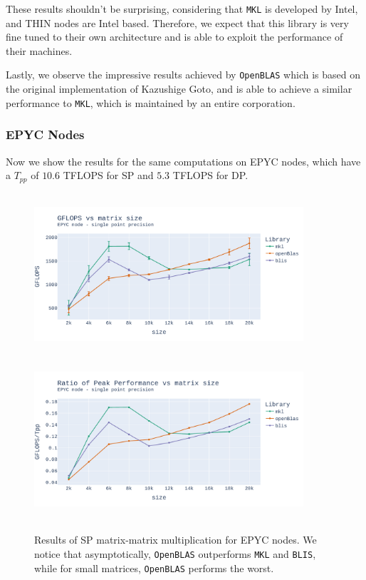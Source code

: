 \documentclass{report}
\begin{document}
These results shouldn't be surprising, considering 
that \texttt{MKL} is developed by Intel, and THIN nodes are Intel based.
Therefore, we expect that this library is very fine tuned to their own architecture 
and is able to exploit the performance of their machines.

Lastly, we observe the impressive results achieved by \texttt{OpenBLAS} which 
is based on the original implementation of Kazushige Goto, and is able to achieve a similar performance to 
\texttt{MKL}, which is maintained by an entire corporation.

\subsubsection{EPYC Nodes}

Now we show the results for the same computations on EPYC nodes, which have a 
$T_{pp}$ of $10.6$ TFLOPS for SP and $5.3$ TFLOPS for DP.

\begin{figure}[h!p]
\hspace*{-2.5cm}
\includegraphics[width=10cm, height=6cm]{./images/fixed_cores_epyc_float_gflops.pdf}
\includegraphics[width=10cm, height=6cm]{./images/fixed_cores_epyc_float_gflops_ratio.pdf}
\caption{\label{fig:fixed_cores_epyc_float} Results of SP matrix-matrix multiplication 
for EPYC nodes. We notice that asymptotically, \texttt{OpenBLAS} outperforms 
\texttt{MKL} and \texttt{BLIS}, while for small matrices, \texttt{OpenBLAS} 
performs the worst.}
\end{figure} 
\end{document}
